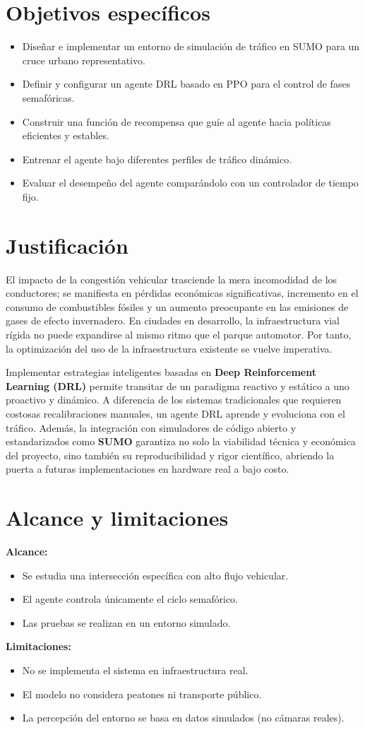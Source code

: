\section{Objetivos específicos}
\begin{itemize}
    \item Diseñar e implementar un entorno de simulación de tráfico en SUMO para un cruce urbano representativo.
    \item Definir y configurar un agente DRL basado en PPO para el control de fases semafóricas.
    \item Construir una función de recompensa que guíe al agente hacia políticas eficientes y estables.
    \item Entrenar el agente bajo diferentes perfiles de tráfico dinámico.
    \item Evaluar el desempeño del agente comparándolo con un controlador de tiempo fijo.
\end{itemize}

\section{Justificación}
El impacto de la congestión vehicular trasciende la mera incomodidad de los conductores; se manifiesta en pérdidas económicas significativas, incremento en el consumo de combustibles fósiles y un aumento preocupante en las emisiones de gases de efecto invernadero. En ciudades en desarrollo, la infraestructura vial rígida no puede expandirse al mismo ritmo que el parque automotor. Por tanto, la optimización del uso de la infraestructura existente se vuelve imperativa.

Implementar estrategias inteligentes basadas en \textbf{Deep Reinforcement Learning (DRL)} permite transitar de un paradigma reactivo y estático a uno proactivo y dinámico. A diferencia de los sistemas tradicionales que requieren costosas recalibraciones manuales, un agente DRL aprende y evoluciona con el tráfico. Además, la integración con simuladores de código abierto y estandarizados como \textbf{SUMO} garantiza no solo la viabilidad técnica y económica del proyecto, sino también su reproducibilidad y rigor científico, abriendo la puerta a futuras implementaciones en hardware real a bajo costo.

\section{Alcance y limitaciones}
\textbf{Alcance:}
\begin{itemize}
    \item Se estudia una intersección específica con alto flujo vehicular.
    \item El agente controla únicamente el ciclo semafórico.
    \item Las pruebas se realizan en un entorno simulado.
\end{itemize}

\textbf{Limitaciones:}
\begin{itemize}
    \item No se implementa el sistema en infraestructura real.
    \item El modelo no considera peatones ni transporte público.
    \item La percepción del entorno se basa en datos simulados (no cámaras reales).
\end{itemize}
